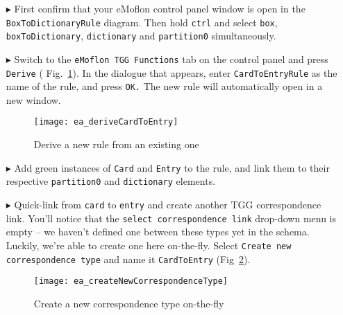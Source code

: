 \begin{enumerate}
  
\item[$\blacktriangleright$] First confirm that your eMoflon control panel window is open in the \texttt{Box\-To\-Dictionary\-Rule} diagram. Then hold
\texttt{ctrl} and select \texttt{box}, \texttt{box\-To\-Dictionary}, \texttt{dictionary} and \texttt{partition0} simultaneously.
  
\item[$\blacktriangleright$] Switch to the \texttt{eMoflon TGG Functions} tab on the control panel and press \texttt{Derive} (
Fig.~\ref{ea:derive_from_tgg_rule}). In the dialogue that appears, enter \texttt{Card\-To\-Ent\-ry\-Rule} as the name of the rule, and press \texttt{OK.} The
new rule will automatically open in a new window.

\begin{figure}[htbp]
\begin{center}
 \texttt{[image: ea\_deriveCardToEntry]}
  \caption{Derive a new rule from an existing one}
  \label{ea:derive_from_tgg_rule}
\end{center}
\end{figure}
\FloatBarrier

\item[$\blacktriangleright$] Add green instances of \texttt{Card} and \texttt{Entry} to the rule, and link them to their respective \texttt{partition0} and
\texttt{dictionary} elements. 

\vspace{0.5cm}

\item[$\blacktriangleright$] Quick-link from \texttt{card} to \texttt{entry} and create another TGG correspondence link. You'll notice that the
\texttt{select correspondence link} drop-down menu is empty -- we haven't defined one between these types yet in the schema. Luckily, we're able to create one
here on-the-fly. Select \texttt{Create new correspondence type} and name it \texttt{CardToEntry} (Fig~\ref{ea:newCorrespondenceDialogue}). 

\vspace{0.5cm}

\begin{figure}[htbp]
\begin{center}
 \texttt{[image: ea\_createNewCorrespondenceType]}
  \caption{Create a new correspondence type on-the-fly}
  \label{ea:newCorrespondenceDialogue}
\end{center}
\end{figure}


\end{enumerate}
